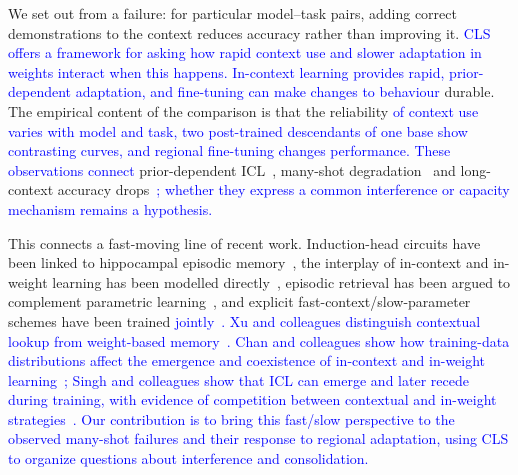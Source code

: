 \documentclass[pdflatex, sn-nature]{sn-jnl}%
\theoremstyle{thmstyleone}%
\theoremstyle{thmstyletwo}%
\theoremstyle{thmstylethree}%
\begin{document}
We set out from a failure: for particular model--task pairs, adding correct
demonstrations to the context reduces accuracy rather than improving it. \textcolor{blue}{CLS offers a
framework for asking how rapid context use and slower adaptation in weights interact
when this happens. In-context learning provides rapid, prior-dependent adaptation,
and fine-tuning can make changes to behaviour} durable. The empirical content of the
comparison is that the reliability \textcolor{blue}{of context use varies with model and task, two
post-trained descendants of one base show contrasting curves, and regional
fine-tuning changes performance. These observations connect} prior-dependent
ICL~\cite{pan2023whaticllearns,wei2023largericldifferently}, many-shot
degradation~\cite{tang2025overprompting,zhang2025moreisnotbetter} and long-context
accuracy drops~\cite{zou2025manyiclbench}\textcolor{blue}{; whether they express a common interference
or capacity mechanism remains a hypothesis.}

This connects a fast-moving line of recent work. Induction-head circuits have been
linked to hippocampal episodic memory~\cite{jian2024icl}, the interplay of in-context
and in-weight learning has been modelled directly~\cite{russin2025iclinweight},
episodic retrieval has been argued to complement parametric
learning~\cite{lampinen2025latent}, and explicit fast-context/slow-parameter schemes
have been trained \textcolor{blue}{jointly}~\textcolor{blue}{\cite{tiwari2026fastslow}}\textcolor{blue}{. Xu and colleagues distinguish
contextual lookup from weight-based memory}~\textcolor{blue}{\cite{xu2026memo}}\textcolor{blue}{. Chan and colleagues
show how training-data distributions affect the emergence and coexistence of
in-context and in-weight learning}~\textcolor{blue}{\cite{chan2022distributional}}\textcolor{blue}{; Singh and colleagues
show that ICL can emerge and later recede during training, with evidence of competition
between contextual and in-weight strategies}~\textcolor{blue}{\cite{singh2023transient}}\textcolor{blue}{. Our contribution
is to bring this fast/slow perspective to the observed many-shot failures and their
response to regional adaptation, using CLS to organize questions about interference
and consolidation.}
\end{document}
